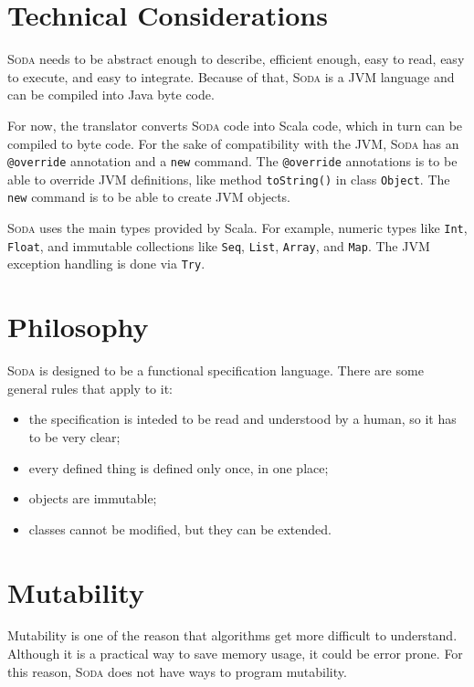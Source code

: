 \documentclass[12pt,a4paper]{book}
\makeatletter
\newcommand{\srccode}[1]{\texttt{{#1}}}
\newcommand{\reservedWord}[1]{{\color{blue}\srccode{#1}}\xspace}
\newcommand{\annotation}[1]{{\color{brown}\srccode{#1}}\xspace}
\newcommand{\snew}{\reservedWord{new}}
\newcommand{\soverride}{\annotation{@override}}
\newcommand{\Soda}{\textsc{Soda}\xspace}
\makeatother
\begin{document}
    \section{Technical Considerations}

    \Soda needs to be abstract enough to describe, efficient enough, easy to read, easy to execute, and easy to integrate.
    Because of that, \Soda is a JVM language and can be compiled into Java byte code.

    For now, the translator converts \Soda code into Scala code, which in turn can be compiled to byte code.
    For the sake of compatibility with the JVM, \Soda has an \soverride annotation and a \snew command.
    The \soverride annotations is to be able to override JVM definitions, like method \srccode{toString()} in class \srccode{Object}.
    The \snew command is to be able to create JVM objects.

    \Soda uses the main types provided by Scala.
    For example, numeric types like \srccode{Int}, \srccode{Float}, and immutable collections like \srccode{Seq}, \srccode{List}, \srccode{Array}, and \srccode{Map}.
    The JVM exception handling is done via \srccode{Try}.


    \section{Philosophy}

    \Soda is designed to be a functional specification language.
    There are some general rules that apply to it:

    \begin{itemize}
        \item the specification is inteded to be read and understood by a human, so it has to be very clear;
        \item every defined thing is defined only once, in one place;
        \item objects are immutable;
        \item classes cannot be modified, but they can be extended.
    \end{itemize}


    \section{Mutability}

    Mutability is one of the reason that algorithms get more difficult to understand.
    Although it is a practical way to save memory usage, it could be error prone.
    For this reason, \Soda does not have ways to program mutability.
\end{document}
